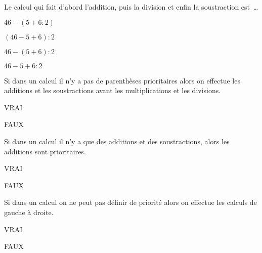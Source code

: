 \begin{QCM}
\begin{GroupeQCM}
\begin{exercice}
      Le calcul qui fait d'abord  l'addition, puis la division et enfin la soustraction est \ldots
      \begin{ChoixQCM}{4}
      \item $46 - (5 + 6 : 2)$
      \item $(46 - 5 + 6) : 2$
      \item $46 - (5 + 6) : 2$
      \item $46 - 5 + 6 : 2$
      \end{ChoixQCM}
\begin{corrige}
   \end{corrige}
    \end{exercice}
    
\begin{exercice}
      Si dans un calcul il n'y a pas de parenthèses prioritaires alors on effectue les additions et les soustractions avant les multiplications et les divisions.
      \begin{ChoixQCM}{4}
      \item VRAI
      \item FAUX
      \end{ChoixQCM}
\begin{corrige}
   \end{corrige}
    \end{exercice}
  

\end{GroupeQCM}
\end{QCM}



\begin{QCM}
  \begin{GroupeQCM}
  
\begin{exercice}
      Si dans un calcul il n'y a que des additions et des soustractions, alors les additions sont prioritaires.
      \begin{ChoixQCM}{4}
      \item VRAI
      \item FAUX
      \end{ChoixQCM}
\begin{corrige}
   \end{corrige}
    \end{exercice}
    
\begin{exercice}
      Si dans un calcul on ne peut pas définir de priorité alors on effectue les calculs de gauche à droite.
      \begin{ChoixQCM}{4}
      \item VRAI
      \item FAUX
      \end{ChoixQCM}
\begin{corrige}
   \end{corrige}
    \end{exercice}

\end{GroupeQCM}
\end{QCM}

  
